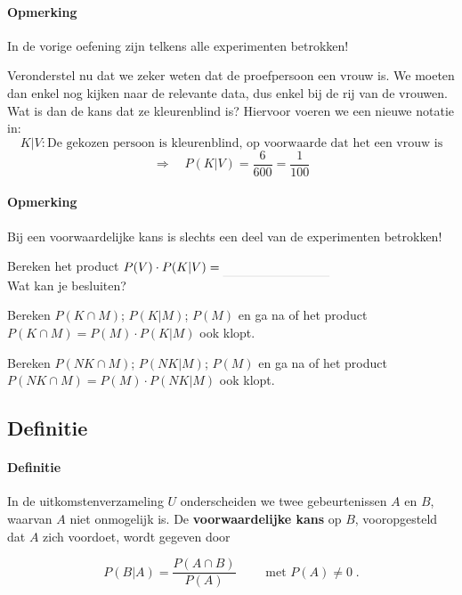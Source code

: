 \documentclass[12pt,twoside]{article}
\begin{document}
\paragraph*{Opmerking} In de vorige oefening zijn telkens alle experimenten betrokken!


Veronderstel nu dat we zeker weten dat de proefpersoon een vrouw is. We moeten dan enkel nog kijken naar de relevante data, dus enkel bij de rij van de vrouwen. Wat is dan de kans dat ze kleurenblind is? Hiervoor voeren we een nieuwe notatie in:
$$K|V:\mbox{De gekozen persoon is kleurenblind, op voorwaarde dat het een vrouw is}$$
$$\Rightarrow\quad P(K|V)=\dfrac{6}{600}=\dfrac{1}{100}$$

\paragraph*{Opmerking} Bij een voorwaardelijke kans is slechts een deel van de experimenten betrokken!

\begin{oefening}
Bereken het product $P(V)\cdot P(K|V)=\arule{3cm}$\\
Wat kan je besluiten?
\end{oefening}

\begin{oefening}
Bereken $P(K\cap M)$; $P(K|M)$; $P(M)$ en ga na of het product $P(K\cap M)=P(M)\cdot P(K|M)$ ook klopt.
\end{oefening}

\begin{oefening}
Bereken $P(NK\cap M)$; $P(NK|M)$; $P(M)$ en ga na of het product $P(NK\cap M)=P(M)\cdot P(NK|M)$ ook klopt.
\end{oefening}

\subsection{Definitie}

\paragraph*{Definitie}
In de uitkomstenverzameling $U$ onderscheiden we twee gebeurtenissen $A$ en $B$, waarvan $A$ niet onmogelijk is. De {\bf voorwaardelijke kans} op $B$, vooropgesteld dat $A$ zich voordoet, wordt gegeven door\\
\begin{mdframed}
$$P(B|A)=\dfrac{P(A\cap B)}{P(A)}\qquad\mbox{ met }P(A)\neq 0\;.$$
\end{mdframed}
\end{document}
